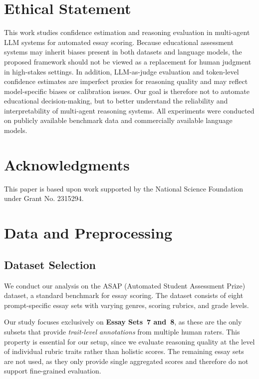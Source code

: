 \documentclass[11pt]{article}
\begin{document}
\section*{Ethical Statement}
This work studies confidence estimation and reasoning evaluation in multi-agent LLM systems for automated essay scoring. Because educational assessment systems may inherit biases present in both datasets and language models, the proposed framework should not be viewed as a replacement for human judgment in high-stakes settings. In addition, LLM-as-judge evaluation and token-level confidence estimates are imperfect proxies for reasoning quality and may reflect model-specific biases or calibration issues. Our goal is therefore not to automate educational decision-making, but to better understand the reliability and interpretability of multi-agent reasoning systems. All experiments were conducted on publicly available benchmark data and commercially available language models.

\section*{Acknowledgments}
This paper is based upon work supported by the National Science Foundation under Grant No. 2315294.


%


\appendix

\section{Data and Preprocessing}
\label{app:data}

\subsection{Dataset Selection}

We conduct our analysis on the ASAP (Automated Student Assessment Prize) dataset, a standard benchmark for essay scoring. The dataset consists of eight prompt-specific essay sets with varying genres, scoring rubrics, and grade levels. 

Our study focuses exclusively on \textbf{Essay Sets~7 and~8}, as these are the only subsets that provide \emph{trait-level annotations} from multiple human raters. This property is essential for our setup, since we evaluate reasoning quality at the level of individual rubric traits rather than holistic scores. The remaining essay sets are not used, as they only provide single aggregated scores and therefore do not support fine-grained evaluation.
\end{document}
